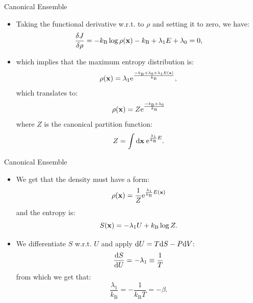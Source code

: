 \documentclass[10pt]{beamer}
\begin{document}
\begin{frame}{Canonical Ensemble}
\begin{itemize}
\setlength\itemsep{1em}
  \item Taking the functional derivative w.r.t. to $\rho$ and setting it to zero, we have:
  \begin{equation}
    \frac{\delta J}{\delta \rho} = -k_\mathrm{B} \log\rho({\bf x}) - k_\mathrm{B} + \lambda_1 E + \lambda_0 = 0,
  \end{equation}

  \item which implies that the maximum entropy distribution is:
  \begin{equation}
    \rho({\bf x}) = \lambda_1 \mathrm{e}^{\frac{-k_\mathrm{B}+\lambda_0+\lambda_1 E({\bf x}) }{ k_\mathrm{B} }},
  \end{equation}
  which translates to:
  \begin{equation}
    \rho({\bf x}) = Z \mathrm{e}^{\frac{ -k_\mathrm{B}+\lambda_0 }{ k_\mathrm{B} }}
  \end{equation}
  where $Z$ is the canonical partition function:
  \begin{equation}
    Z=\int\mathrm{d}{\bf x}\; \mathrm{e}^{\frac{\lambda_1}{k_\mathrm{B}} E}.
  \end{equation}
\end{itemize}
\end{frame}

\begin{frame}{Canonical Ensemble}
\begin{itemize}
\setlength\itemsep{1em}
  \item We get that the density must have a form:
  \begin{equation}
    \rho({\bf x}) = \frac{1}{Z}\mathrm{e}^{\frac{\lambda_1}{k_\mathrm{B}} E({\bf x})}
  \end{equation}
  and the entropy is:
  \begin{equation}
    S({\bf x}) = -\lambda_1 U + k_\mathrm{B}\log Z.
  \end{equation}

  \item We differentiate $S$ w.r.t. $U$ and apply $\mathrm{d} U = T\mathrm{d} S - P\mathrm{d} V$:
  \begin{equation}
    \frac{\mathrm{d} S}{\mathrm{d} U} = -\lambda_1 \equiv \frac{1}{T}
  \end{equation}
  from which we get that:
  \begin{equation}
    \frac{\lambda_1}{k_\mathrm{B}} = -\frac{1}{k_\mathrm{B}T} = -\beta.
  \end{equation}
\end{itemize}
\end{frame}
\end{document}

